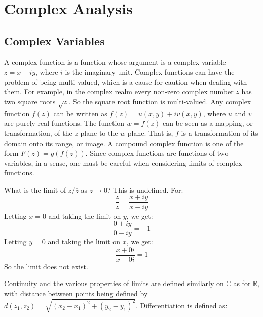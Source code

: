 \chapter{Complex Analysis}
    \section{Complex Variables}
        A complex function is a function whose argument is a complex
        variable $z=x+iy$, where $i$ is the imaginary unit. Complex
        functions can have the problem of being multi-valued, which
        is a cause for caution when dealing with them. For example,
        in the complex realm every non-zero complex number $z$
        has two square roots $\sqrt{z}$. So the square root
        function is multi-valued. Any complex function $f(z)$ can
        be written as $f(z)=u(x,y)+iv(x,y)$, where $u$ and $v$ are
        purely real functions. The function $w=f(z)$ can be seen
        as a mapping, or transformation, of the $z$ plane to
        the $w$ plane. That is, $f$ is a transformation of
        its domain onto its range, or image. A compound complex
        function is one of the form $F(z)=g(f(z))$. Since complex
        functions are functions of two variables, in a sense, one
        must be careful when considering limits of complex functions.
        \begin{example}
            What is the limit of $z/\overline{z}$ as $z\rightarrow{0}$?
            This is undefined. For:
            \begin{equation*}
                \frac{z}{\overline{z}}=\frac{x+iy}{x-iy}
            \end{equation*}
            Letting $x=0$ and taking the limit on $y$,
            we get:
            \begin{equation*}
                \frac{0+iy}{0-iy}=-1
            \end{equation*}
            Letting $y=0$ and taking the limit on $x$,
            we get:
            \begin{equation*}
                \frac{x+0i}{x-0i}=1
            \end{equation*}
            So the limit does not exist.
        \end{example}
        Continuity and the various properties of limits
        are defined similarly on $\mathbb{C}$ as for
        $\mathbb{R}$, with distance between points being
        defined by
        $d(z_{1},z_{2})=\sqrt{(x_{2}-x_{1})^{2}+(y_{2}-y_{1})^{2}}$.
        Differentiation is defined as:
